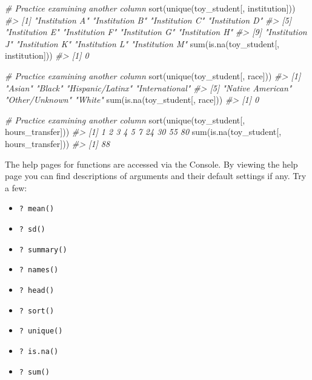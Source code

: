 \documentclass[
]{book}
\newenvironment{Shaded}{\begin{snugshade}}{\end{snugshade}}
\newcommand{\CommentTok}[1]{\textcolor[rgb]{0.56,0.35,0.01}{\textit{#1}}}
\newcommand{\FunctionTok}[1]{\textcolor[rgb]{0.00,0.00,0.00}{#1}}
\newcommand{\NormalTok}[1]{#1}
\providecommand{\tightlist}{%
  \setlength{\itemsep}{0pt}\setlength{\parskip}{0pt}}
\begin{document}
\begin{Shaded}
\begin{Highlighting}[]
\CommentTok{\# Practice examining another column}
\FunctionTok{sort}\NormalTok{(}\FunctionTok{unique}\NormalTok{(toy\_student[, institution]))}
\CommentTok{\#\textgreater{}  [1] "Institution A" "Institution B" "Institution C" "Institution D"}
\CommentTok{\#\textgreater{}  [5] "Institution E" "Institution F" "Institution G" "Institution H"}
\CommentTok{\#\textgreater{}  [9] "Institution J" "Institution K" "Institution L" "Institution M"}
\FunctionTok{sum}\NormalTok{(}\FunctionTok{is.na}\NormalTok{(toy\_student[, institution]))}
\CommentTok{\#\textgreater{} [1] 0}

\CommentTok{\# Practice examining another column}
\FunctionTok{sort}\NormalTok{(}\FunctionTok{unique}\NormalTok{(toy\_student[, race]))}
\CommentTok{\#\textgreater{} [1] "Asian"           "Black"           "Hispanic/Latinx" "International"  }
\CommentTok{\#\textgreater{} [5] "Native American" "Other/Unknown"   "White"}
\FunctionTok{sum}\NormalTok{(}\FunctionTok{is.na}\NormalTok{(toy\_student[, race]))}
\CommentTok{\#\textgreater{} [1] 0}

\CommentTok{\# Practice examining another column}
\FunctionTok{sort}\NormalTok{(}\FunctionTok{unique}\NormalTok{(toy\_student[, hours\_transfer]))}
\CommentTok{\#\textgreater{}  [1]  1  2  3  4  5  7 24 30 55 80}
\FunctionTok{sum}\NormalTok{(}\FunctionTok{is.na}\NormalTok{(toy\_student[, hours\_transfer]))}
\CommentTok{\#\textgreater{} [1] 88}
\end{Highlighting}
\end{Shaded}

The help pages for functions are accessed via the Console. By viewing the help page you can find descriptions of arguments and their default settings if any. Try a few:

\begin{itemize}
\tightlist
\item
  \texttt{?\ mean()}
\item
  \texttt{?\ sd()}
\item
  \texttt{?\ summary()}
\item
  \texttt{?\ names()}
\item
  \texttt{?\ head()}
\item
  \texttt{?\ sort()}
\item
  \texttt{?\ unique()}
\item
  \texttt{?\ is.na()}
\item
  \texttt{?\ sum()}
\end{itemize}
\end{document}
